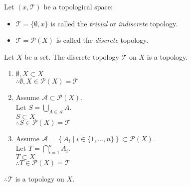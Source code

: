 \documentclass[letterpaper,12pt,fleqn]{article}
\newcommand{\A}{\mathcal{A}}
\renewcommand{\P}{\mathcal{P}}
\newcommand{\T}{\mathcal{T}}
\begin{document}
\begin{definition}[Discrete]
  Let $(x,\T)$ be a topological space:
  \begin{itemize}
  \item $\T=\{\emptyset,x\}$ is called the \emph{trivial} or \emph{indiscrete}
    topology.
  \item $\T=\P(X)$ is called the \emph{discrete} topology.
  \end{itemize}
\end{definition}

\begin{theorem}
  Let $X$ be a set. The discrete topology $\T$ on $X$ is a topology.
\end{theorem}

\begin{theproof}
  \listbreak
  \begin{enumerate}
  \item $\emptyset,X\subset X$ \\
    $\therefore\emptyset,X\in\P(X)=\T$

  \item Assume $\A\subset\P(X)$. \\
    Let $S=\bigcup_{A\in\A}A$. \\
    $S\subset X$ \\
    $\therefore S\in\P(X)=\T$

  \item Assume $\A=\left\{A_i\mid i\in\{1,\ldots,n\}\right\}\subset\P(X)$. \\
    Let $T=\bigcap_{i=1}^nA_i$. \\
    $T\subset X$ \\
    $\therefore T\in\P(X)=\T$
  \end{enumerate}
  $\therefore\T$ is a topology on $X$.
\end{theproof}
\end{document}
